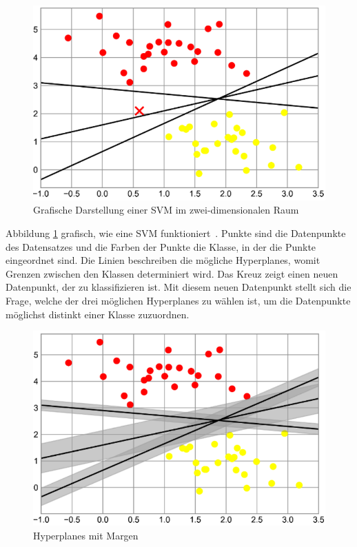\begin{figure}[h]
    \centering
    \includegraphics[scale=0.5]{figures/support_vector_new_point.png}
    \caption{Grafische Darstellung einer SVM im zwei-dimensionalen Raum}
    \label{fig:svm_graphic}
\end{figure}

Abbildung \ref{fig:svm_graphic} grafisch, wie eine SVM funktioniert~\cite[S. 437]{10.5555/3133359}. Punkte sind die Datenpunkte des Datensatzes und die Farben der Punkte die Klasse, in der die Punkte eingeordnet sind.
Die Linien beschreiben die mögliche Hyperplanes, womit Grenzen zwischen den Klassen determiniert wird. Das Kreuz zeigt einen neuen Datenpunkt, der zu klassifizieren ist. Mit diesem neuen Datenpunkt stellt sich die Frage, welche der drei möglichen Hyperplanes zu wählen ist, um die Datenpunkte möglichst distinkt einer Klasse zuzuordnen.

\pagebreak

\begin{figure}[h]
    \centering
    \includegraphics[scale=0.5]{figures/support_vector_maschine_margins.png}
    \caption{Hyperplanes mit Margen}
    \label{fig:svm_margins}
\end{figure}

